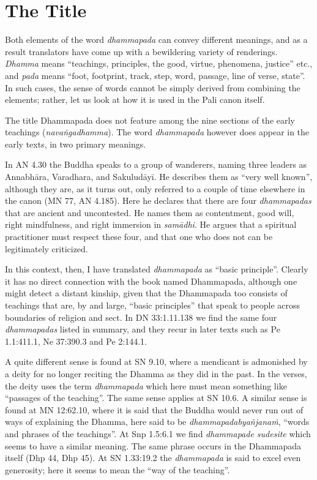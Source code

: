 \documentclass[12pt,openany]{book}%
\begin{document}
\section*{The Title}

Both elements of the word \textit{dhammapada} can convey different meanings, and as a result translators have come up with a bewildering variety of renderings. \textit{Dhamma} means “teachings, principles, the good, virtue, phenomena, justice” etc.,  and \textit{pada} means “foot, footprint, track, step, word, passage, line of verse, state”. In such cases, the sense of words cannot be simply derived from combining the elements; rather, let us look at how it is used in the Pali canon itself.

The title Dhammapada does not feature among the nine sections of the early teachings (\textit{\textsanskrit{navaṅgadhamma}}). The word \textit{dhammapada} however does appear in the early texts, in two primary meanings.

In AN 4.30 the Buddha speaks to a group of wanderers, naming three leaders as \textsanskrit{Annabhāra}, Varadhara, and \textsanskrit{Sakuludāyī}. He describes them as “very well known”, although they are, as it turns out, only referred to a couple of time elsewhere in the canon (MN 77, AN 4.185). Here he declares that there are four \textit{dhammapadas} that are ancient and uncontested. He names them as contentment, good will, right mindfulness, and right immersion in \textit{\textsanskrit{samādhi}}. He argues that a spiritual practitioner must respect these four, and that one who does not can be legitimately criticized.

In this context, then, I have translated \textit{dhammapada} as “basic principle”. Clearly it has no direct connection with the book named Dhammapada, although one might detect a distant kinship, given that the Dhammapada too consists of teachings that are, by and large, “basic principles” that speak to people across boundaries of religion and sect. In DN 33:1.11.138 we find the same four \textit{dhammapadas} listed in summary, and they recur in later texts such as Pe 1.1:411.1, Ne 37:390.3 and Pe 2:144.1.

A quite different sense is found at SN 9.10, where a mendicant is admonished by a deity for no longer reciting the Dhamma as they did in the past. In the verses, the deity uses the term \textit{dhammapada} which here must mean something like “passages of the teaching”.  The same sense applies at SN 10.6. A similar sense is found at MN 12:62.10, where it is said that the Buddha would never run out of ways of explaining the Dhamma, here said to be \textit{\textsanskrit{dhammapadabyañjanaṁ}}, “words and phrases of the teachings”. At Snp 1.5:6.1 we find \textit{dhammapade sudesite} which seems to have a similar meaning. The same phrase occurs in the Dhammapada itself (Dhp 44, Dhp 45). At SN 1.33:19.2 the \textit{dhammapada} is said to excel even generosity; here it seems to mean the “way of the teaching”.
\end{document}
